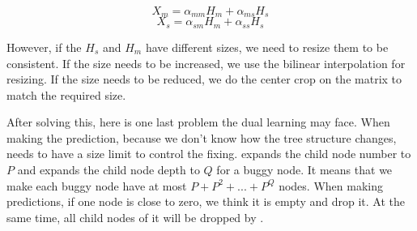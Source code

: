 \begin{equation}\label{eq:4}
	X_m = \alpha_{mm}H_m + \alpha_{ms}H_s
\end{equation}
\begin{equation}\label{eq:5}
	X_s = \alpha_{sm}H_m + \alpha_{ss}H_s
\end{equation}

However, if the $H_s$ and $H_m$ have different sizes, we need to resize them to be consistent. If the size needs to be increased, we use the bilinear interpolation for resizing. If the size needs to be reduced, we do the center crop on the matrix to match the required size.

After solving this, here is one last problem the dual learning may face. When making the prediction, because we don't know how the tree structure changes, \tool needs to have a size limit to control the fixing. \tool expands the child node number to $P$ and expands the child node depth to $Q$ for a buggy node. It means that we make each buggy node have at most $P+P^2+...+P^Q$ nodes. When making predictions, if one node is close to zero, we think it is empty and drop it. At the same time, all child nodes of it will be dropped by \tool.
